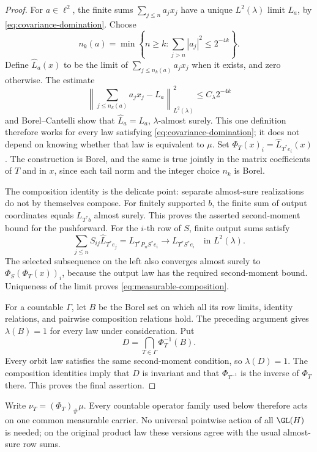 \begin{proof}
For \(a\in\ell^2\), the finite sums \(\sum_{j\leq n}a_jx_j\) have a
unique \(L^2(\lambda)\) limit \(L_a\), by
\eqref{eq:covariance-domination}.  Choose
\[
  n_k(a)=\min\left\{n\geq k:
                \sum_{j>n}|a_j|^2\leq2^{-4k}\right\}.
\]
Define \(\widehat L_a(x)\) to be the limit of
\(\sum_{j\leq n_k(a)}a_jx_j\) when it exists, and zero otherwise.
The estimate
\[
  \left\|\sum_{j\leq n_k(a)}a_jx_j-L_a\right\|_{L^2(\lambda)}^2
  \leq C_\lambda2^{-4k}
\]
and Borel--Cantelli show that \(\widehat L_a=L_a\),
\(\lambda\)-almost surely.  This one definition therefore works for every
law satisfying \eqref{eq:covariance-domination}; it does not depend on
knowing whether that law is equivalent to \(\mu\).  Set
\(\Phi_T(x)_i=\widehat L_{T^*e_i}(x)\).  The construction is Borel,
and the same is true jointly in the matrix coefficients of \(T\) and in
\(x\), since each tail norm and the integer choice \(n_k\) is Borel.

The composition identity is the delicate point: separate almost-sure
realizations do not by themselves compose.  For finitely supported \(b\), the
finite sum of output coordinates equals
\(L_{T^*b}\) almost surely.  This proves the asserted second-moment bound
for the pushforward.  For the \(i\)-th row of \(S\), finite output sums
satisfy
\[
  \sum_{j\leq n}S_{ij}\widehat L_{T^*e_j}
     =L_{T^*P_nS^*e_i}
     \longrightarrow L_{T^*S^*e_i}
     \quad\text{in }L^2(\lambda).
\]
The selected subsequence on the left also converges almost surely to
\(\Phi_S(\Phi_T(x))_i\), because the output law has the required
second-moment bound.  Uniqueness of the limit proves
\eqref{eq:measurable-composition}.

For a countable \(\Gamma\), let \(B\) be the Borel set on which all its
row limits, identity relations, and pairwise composition relations hold.
The preceding argument gives \(\lambda(B)=1\) for every law under
consideration.  Put
\[
  D=\bigcap_{T\in\Gamma}\Phi_T^{-1}(B).
\]
Every orbit law satisfies the same second-moment condition, so
\(\lambda(D)=1\).  The composition identities imply that
\(D\) is invariant and that \(\Phi_{T^{-1}}\) is the inverse of
\(\Phi_T\) there.  This proves the final assertion.
\end{proof}

Write \(\nu_T=(\Phi_T)_\#\mu\).  Every countable operator family used below
therefore acts on one common measurable carrier.  No universal pointwise action of all
\(\GL(H)\) is needed; on the original product law these versions agree with
the usual almost-sure row sums.

